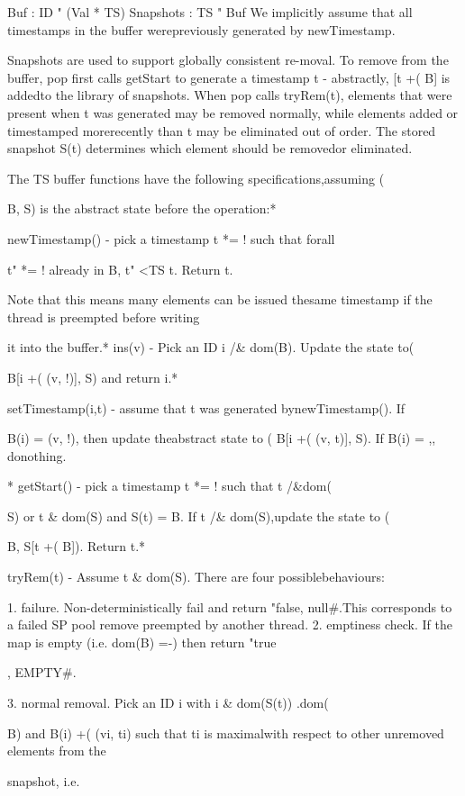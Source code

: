 Buf : ID " (Val * TS) Snapshots : TS " Buf
We implicitly assume that all timestamps in the buffer werepreviously generated by newTimestamp.

Snapshots are used to support globally consistent re-moval. To remove from the buffer, pop first calls getStart
to generate a timestamp t - abstractly, [t +( B] is addedto the library of snapshots. When pop calls tryRem(t), elements that were present when t was generated may be removed normally, while elements added or timestamped morerecently than t may be eliminated out of order. The stored
snapshot S(t) determines which element should be removedor eliminated.

The TS buffer functions have the following specifications,assuming (

B, S) is the abstract state before the operation:*

newTimestamp() - pick a timestamp t *= ! such that forall

t" *= ! already in B, t" <TS t. Return t.

Note that this means many elements can be issued thesame timestamp if the thread is preempted before writing

it into the buffer.*
ins(v) - Pick an ID i /& dom(B). Update the state to(

B[i +( (v, !)], S) and return i.*

setTimestamp(i,t) - assume that t was generated bynewTimestamp(). If

B(i) = (v, !), then update theabstract state to (
B[i +( (v, t)], S). If B(i) = ,, donothing.

* getStart() - pick a timestamp t *= ! such that t /&dom(

S) or t & dom(S) and S(t) = B. If t /& dom(S),update the state to (

B, S[t +( B]). Return t.*

tryRem(t) - Assume t & dom(S). There are four possiblebehaviours:

1. failure. Non-deterministically fail and return "false, null#.This corresponds to a failed SP pool remove preempted by another thread.
2. emptiness check. If the map is empty (i.e. dom(B) =-) then return "true

, EMPTY#.

3. normal removal. Pick an ID i with i & dom(S(t)) .dom(

B) and B(i) +( (vi, ti) such that ti is maximalwith respect to other unremoved elements from the

snapshot, i.e.

